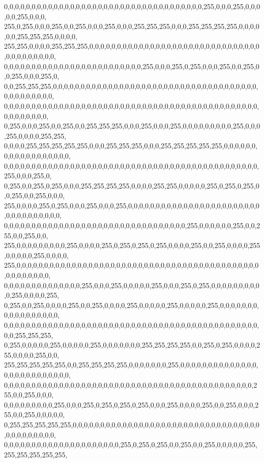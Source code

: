 \begin{DoxyCode}
      0,0,0,0,0,0,0,0,0,0,0,0,0,0,0,0,0,0,0,0,0,0,0,0,0,0,0,0,0,0,0,0,0,0,0,0,255,0,0,0,255,0,0,0,0,0,255,0,0,0,
      255,0,255,0,0,0,255,0,0,255,0,0,0,255,0,0,0,255,255,255,0,0,0,255,255,255,255,0,0,0,0,0,0,255,255,255,0,0,0,0,
      255,255,0,0,0,0,255,255,255,0,0,0,0,0,0,0,0,0,0,0,0,0,0,0,0,0,0,0,0,0,0,0,0,0,0,0,0,0,0,0,0,0,0,0,0,0,0,0,0,
      0,0,0,0,0,0,0,0,0,0,0,0,0,0,0,0,0,0,0,0,0,0,0,0,0,255,0,0,0,255,0,255,0,0,0,255,0,0,255,0,0,255,0,0,0,255,0,
      0,0,255,255,255,0,0,0,0,0,0,0,0,0,0,0,0,0,0,0,0,0,0,0,0,0,0,0,0,0,0,0,0,0,0,0,0,0,0,0,0,0,0,0,0,0,0,0,0,0,0,
      0,0,0,0,0,0,0,0,0,0,0,0,0,0,0,0,0,0,0,0,0,0,0,0,0,0,0,0,0,0,0,0,0,0,0,0,0,0,0,0,0,0,0,0,0,0,0,0,0,0,0,0,0,0,
      0,255,0,0,0,255,0,0,255,0,0,255,255,255,0,0,0,255,0,0,0,255,0,0,0,0,0,0,0,0,0,255,0,0,0,255,0,0,0,0,255,255,
      0,0,0,0,255,255,255,255,255,0,0,0,255,255,255,0,0,0,255,255,255,255,255,0,0,0,0,0,0,0,0,0,0,0,0,0,0,0,0,0,0,
      0,0,0,0,0,0,0,0,0,0,0,0,0,0,0,0,0,0,0,0,0,0,0,0,0,0,0,0,0,0,0,0,0,0,0,0,0,0,0,0,0,0,0,0,0,0,255,0,0,0,255,0,
      0,255,0,0,255,0,255,0,0,0,255,255,255,255,0,0,0,0,255,255,0,0,0,0,0,255,0,255,0,255,0,0,255,0,0,255,0,0,0,
      255,0,0,0,0,255,0,255,0,0,0,255,0,0,0,255,0,0,0,0,0,0,0,0,0,0,0,0,0,0,0,0,0,0,0,0,0,0,0,0,0,0,0,0,0,0,0,0,0,0,
      0,0,0,0,0,0,0,0,0,0,0,0,0,0,0,0,0,0,0,0,0,0,0,0,0,0,0,0,0,0,0,0,0,255,0,0,0,0,0,0,255,0,0,255,0,0,255,0,0,
      255,0,0,0,0,0,0,0,0,0,255,0,0,0,0,255,0,255,0,255,0,255,0,0,0,0,255,0,0,255,0,0,0,0,255,0,0,0,0,0,255,0,0,0,0,
      255,0,0,0,0,0,0,0,0,0,0,0,0,0,0,0,0,0,0,0,0,0,0,0,0,0,0,0,0,0,0,0,0,0,0,0,0,0,0,0,0,0,0,0,0,0,0,0,0,0,0,0,0,
      0,0,0,0,0,0,0,0,0,0,0,0,0,0,255,0,0,0,255,0,0,0,0,0,255,0,0,0,255,0,255,0,0,0,0,0,0,0,0,0,0,255,0,0,0,0,255,
      0,255,0,0,255,0,0,0,0,255,0,0,255,0,0,0,0,255,0,0,0,0,0,255,0,0,0,0,0,255,0,0,0,0,0,0,0,0,0,0,0,0,0,0,0,0,0,
      0,0,0,0,0,0,0,0,0,0,0,0,0,0,0,0,0,0,0,0,0,0,0,0,0,0,0,0,0,0,0,0,0,0,0,0,0,0,0,0,0,0,0,0,0,0,0,0,255,255,255,
      0,255,0,0,0,0,0,255,0,0,0,0,0,255,0,0,0,0,0,0,0,255,255,255,255,0,0,255,0,255,0,0,0,0,255,0,0,0,0,255,0,0,
      255,255,255,255,255,0,0,255,255,255,255,0,0,0,0,0,0,0,255,0,0,0,0,0,0,0,0,0,0,0,0,0,0,0,0,0,0,0,0,0,0,0,0,0,0,
      0,0,0,0,0,0,0,0,0,0,0,0,0,0,0,0,0,0,0,0,0,0,0,0,0,0,0,0,0,0,0,0,0,0,0,0,0,0,0,0,0,0,0,0,0,255,0,0,255,0,0,0,
      0,0,0,0,0,0,0,0,0,255,0,0,0,255,0,255,0,255,0,255,0,0,0,255,0,0,0,0,255,0,0,255,0,0,0,255,0,0,255,0,0,0,0,0,
      0,255,255,255,255,255,0,0,0,0,0,0,0,0,0,0,0,0,0,0,0,0,0,0,0,0,0,0,0,0,0,0,0,0,0,0,0,0,0,0,0,0,0,0,0,0,0,0,0,
      0,0,0,0,0,0,0,0,0,0,0,0,0,0,0,0,0,0,0,0,0,255,0,255,0,255,0,0,255,0,0,255,0,0,0,0,0,255,255,255,255,255,255,

\end{DoxyCode}
